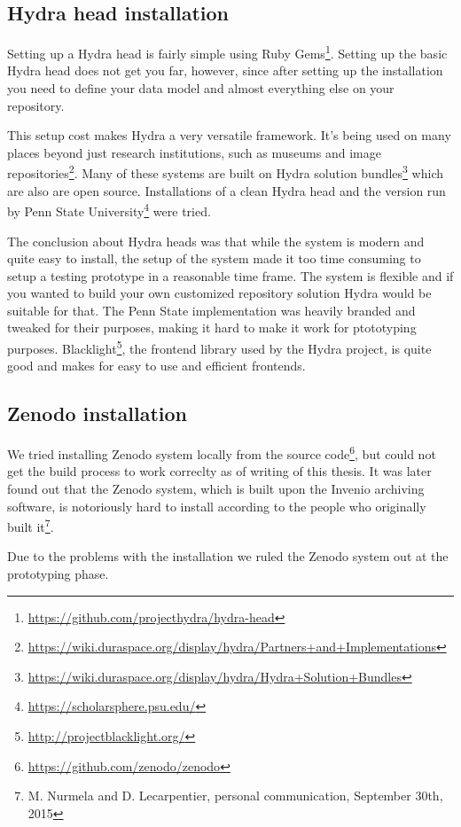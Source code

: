 \subsection{Hydra head installation}

Setting up a Hydra head is fairly simple using Ruby
Gems\footnote{\url{https://github.com/projecthydra/hydra-head}}.
Setting up the basic Hydra head
does not get you far, however, since after setting up the installation you need
to define your data model and almost everything else on your repository.

This setup cost makes Hydra a very versatile framework. It's being used on many
places beyond just research institutions, such as museums and image
repositories\footnote{\url{https://wiki.duraspace.org/display/hydra/Partners+and+Implementations}}.
Many of these systems are built on Hydra solution
bundles\footnote{\url{https://wiki.duraspace.org/display/hydra/Hydra+Solution+Bundles}}
which are also
are open source. Installations of a clean Hydra head and the version
run by Penn State University\footnote{\url{https://scholarsphere.psu.edu/}} were tried.

The conclusion about Hydra heads was that while the system is modern and quite
easy to install, the setup of the system made it too time consuming to setup a
testing prototype in a reasonable time frame. The system is flexible and if you
wanted to build your own customized repository solution Hydra would be suitable
for that. The Penn State implementation was heavily branded and tweaked for
their purposes, making it hard to make it work for ptototyping purposes.
Blacklight\footnote{\url{http://projectblacklight.org/}},
the frontend library used by the Hydra
project, is quite good and makes for easy to use and efficient frontends.

\subsection{Zenodo installation}

We tried installing Zenodo system locally from the source
code\footnote{\url{https://github.com/zenodo/zenodo}}, but could not get the
build process to work correclty as of writing of this thesis.
It was later found out that the Zenodo system, which is built upon the Invenio
archiving software, is notoriously hard to install according to the people who
originally built it\footnote{M. Nurmela and D. Lecarpentier, personal
communication, September 30th, 2015}.

Due to the problems with the installation we ruled the Zenodo system out at
the prototyping phase.

